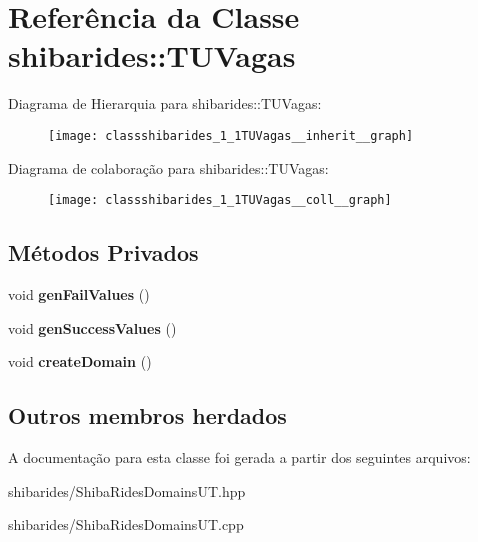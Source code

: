 \hypertarget{classshibarides_1_1TUVagas}{}\section{Referência da Classe shibarides\+:\+:T\+U\+Vagas}
\label{classshibarides_1_1TUVagas}


Diagrama de Hierarquia para shibarides\+:\+:T\+U\+Vagas\+:\nopagebreak
\begin{figure}[H]
\begin{center}
\leavevmode
\texttt{[image: classshibarides\_1\_1TUVagas\_\_inherit\_\_graph]}
\end{center}
\end{figure}


Diagrama de colaboração para shibarides\+:\+:T\+U\+Vagas\+:\nopagebreak
\begin{figure}[H]
\begin{center}
\leavevmode
\texttt{[image: classshibarides\_1\_1TUVagas\_\_coll\_\_graph]}
\end{center}
\end{figure}
\subsection*{Métodos Privados}
\begin{DoxyCompactItemize}
\item 
void {\bfseries gen\+Fail\+Values} ()\hypertarget{classshibarides_1_1TUVagas_a18f9e781e747aceb5bc1d07cffa64d27}{}\label{classshibarides_1_1TUVagas_a18f9e781e747aceb5bc1d07cffa64d27}

\item 
void {\bfseries gen\+Success\+Values} ()\hypertarget{classshibarides_1_1TUVagas_a6c5d71f494a230732543277e1b6fd560}{}\label{classshibarides_1_1TUVagas_a6c5d71f494a230732543277e1b6fd560}

\item 
void {\bfseries create\+Domain} ()\hypertarget{classshibarides_1_1TUVagas_a3808426688f36963beab22b26a402270}{}\label{classshibarides_1_1TUVagas_a3808426688f36963beab22b26a402270}

\end{DoxyCompactItemize}
\subsection*{Outros membros herdados}


A documentação para esta classe foi gerada a partir dos seguintes arquivos\+:\begin{DoxyCompactItemize}
\item 
shibarides/Shiba\+Rides\+Domains\+U\+T.\+hpp\item 
shibarides/Shiba\+Rides\+Domains\+U\+T.\+cpp\end{DoxyCompactItemize}

